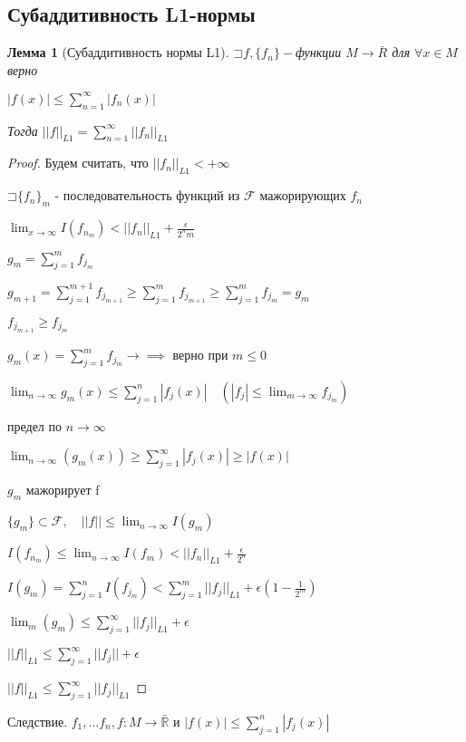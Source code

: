 \documentclass[a4paper]{article}
\newcommand\letsymbol{\mathord{\sqsupset}}
\newtheorem{lemma}{Лемма}[section]
\theoremstyle{definition}
\theoremstyle{remark}
\begin{document}
    \subsection{ Субаддитивность L1-нормы}
    \begin{lemma}[Субаддитивность нормы L1]
     $\letsymbol{}f, \{f_n\} - $функции $M\to \bar{R}$
     для $\forall x\in M$ верно

     $|f(x)| \leq \sum_{n = 1}^{\infty} |f_n(x)| $

     Тогда $||f||_{L1} =\sum_{n = 1}^{\infty} ||f_n||_{L1} $
\end{lemma}
\begin{proof}
     Будем считать, что $||f_n||_{L1}< +\infty$

     $\letsymbol{}\{f_n\}_m$ - последовательность функций из $\mathcal{F} $ мажорирующих $f_n$

     $\lim_{x \to \infty} I(f_{n_m})< ||f_n||_{L1} + \frac{\epsilon}{2^n m}$

     $g_m = \sum_{j = 1}^{m}  f_{j_m}$

     $g_{m+1} = \sum_{j = 1}^{m+1} f_{j_{m+1}} \geq \sum_{j = 1}^{m} f_{j_{m+1}}\geq\sum_{j = 1}^{m}  f_{j_m} = g_m$

     $f_{j_{m+1}}\geq f_{j_m}$ 

     $g_m(x) = \sum_{j = 1}^{m} f_{j_m}\to\implies$ верно при $m\leq 0$

     $\lim_{n\to\infty} g_m(x)\leq \sum_{j = 1}^{n}  |f_j(x)| \quad (|f_j|\leq \lim_{m \to \infty} f_{j_m})$
     
     предел по $n\to\infty$

     $\lim_{n \to \infty}  (g_m(x))\geq \sum_{j = 1}^{\infty} |f_j(x)| \geq |f(x)|$

     $g_m$ мажорирует f

     $\{g_m\}\subset \mathcal{F}, \quad ||f||\leq \lim_{n \to \infty} I(g_m) $

     $I(f_{n_m})\leq \lim_{n \to \infty} I(f_m) < ||f_n||_{L1}+\frac{\epsilon}{2^n}$

     $I(g_m) = \sum_{j = 1}^{n}  I(f_{j_m})< \sum_{j = 1}^{m} ||f_j||_{L1} +\epsilon(1 - \frac{1}{2^m})$

     $\lim_m (g_m)\leq \sum_{j = 1}^{\infty} ||f_j||_{L1} +\epsilon$

     $||f||_{L1}\leq \sum_{j = 1}^{\infty} ||f_j||+\epsilon$

     $||f||_{L1}\leq \sum_{j = 1}^{\infty} ||f_j||_{L1}$
\end{proof}
Следствие. $f_1, \dots f_n, f : M\to \bar{\mathbb{R} }$ и $|f(x)|\leq \sum_{j = 1}^{n}  |f_j(x)|$
\end{document}
